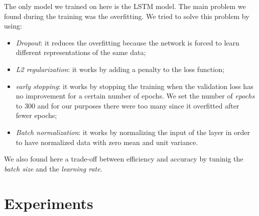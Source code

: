 \documentclass[10pt,twocolumn,letterpaper]{article}
\begin{document}
The only model we trained on here is the LSTM model. The main problem we found during the training 
was the overfitting. We tried to solve this problem by using:
\begin{itemize}
   \item \textit{Dropout}: it reduces the overfitting because the network is forced to learn different representations of the same data;
   \item \textit{L2 regularization}: it works by adding a penalty to the loss function;
   \item \textit{early stopping}: it works by stopping the training when the validation loss 
   has no improvement for a certain number of epochs. We set the number of \textit{epochs} to 
   300 and for our purposes there were too many since it overfitted after fewer epochs;
   \item \textit{Batch normalization}: it works by normalizing the input of the layer in order to have normalized data with zero mean and unit variance.
\end{itemize}
We also found here a trade-off between efficiency and accuracy by tuninig 
the \textit{batch size} and the \textit{learning rate}.

\section{Experiments}
\end{document}
